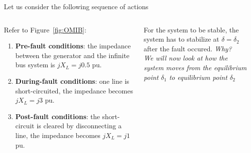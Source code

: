 \begin{frame} {Let us consider the following sequence of actions}

\begin{columns}
\begin{column}{0.6\textwidth}
Refer to Figure~\ref{fig:OMIB}:
\begin{enumerate}
    \item \textbf{Pre-fault conditions}: the impedance between the generator and the infinite bus system is $jX_L = j 0.5$ pu.
    \item \textbf{During-fault conditions}: one line is short-circuited, the impedance becomes $jX_L = j 3$ pu.
    \item \textbf{Post-fault conditions}: the short-circuit is cleared by disconnecting a line, the impedance becomes $jX_L = j 1$ pu.
\end{enumerate}
\end{column}
\begin{column}{0.4\textwidth}
For the system to be stable, the system has to stabilize at $\delta = \delta_2$ after the fault occured. \textit{Why?}\\[\baselineskip]

\emph{We will now look at how the system moves from the equilibrium point $\delta_1$ to equilibrium point $\delta_2$}
\end{column}
\end{columns}
\end{frame}

